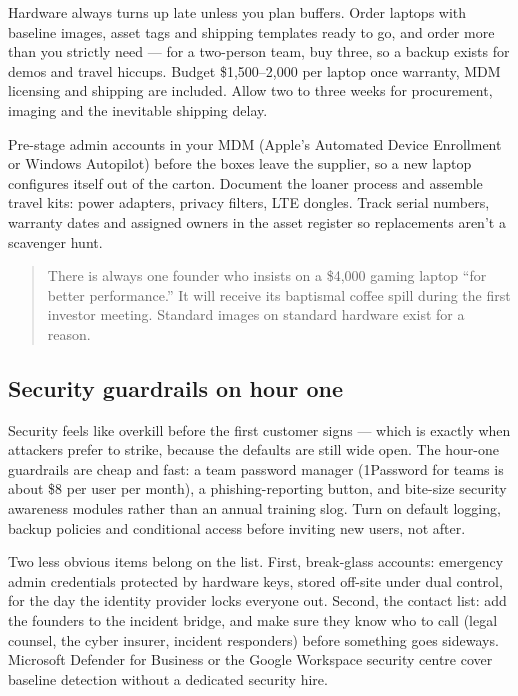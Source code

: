 Hardware always turns up late unless you plan buffers. Order laptops with baseline images, asset tags and shipping templates ready to go, and order more than you strictly need — for a two-person team, buy three, so a backup exists for demos and travel hiccups. Budget \$1,500–2,000 per laptop once warranty, MDM licensing and shipping are included. Allow two to three weeks for procurement, imaging and the inevitable shipping delay.


Pre-stage admin accounts in your MDM (Apple's Automated Device Enrollment or Windows Autopilot) before the boxes leave the supplier, so a new laptop configures itself out of the carton. Document the loaner process and assemble travel kits: power adapters, privacy filters, LTE dongles. Track serial numbers, warranty dates and assigned owners in the asset register so replacements aren't a scavenger hunt.



\begin{quote}\small
There is always one founder who insists on a \$4,000 gaming laptop ``for better performance.'' It will receive its baptismal coffee spill during the first investor meeting. Standard images on standard hardware exist for a reason.
\end{quote}



\subsection{Security guardrails on hour one}


Security feels like overkill before the first customer signs — which is exactly when attackers prefer to strike, because the defaults are still wide open. The hour-one guardrails are cheap and fast: a team password manager (1Password for teams is about \$8 per user per month), a phishing-reporting button, and bite-size security awareness modules rather than an annual training slog. Turn on default logging, backup policies and conditional access before inviting new users, not after.


Two less obvious items belong on the list. First, break-glass accounts: emergency admin credentials protected by hardware keys, stored off-site under dual control, for the day the identity provider locks everyone out. Second, the contact list: add the founders to the incident bridge, and make sure they know who to call (legal counsel, the cyber insurer, incident responders) before something goes sideways. Microsoft Defender for Business or the Google Workspace security centre cover baseline detection without a dedicated security hire.



